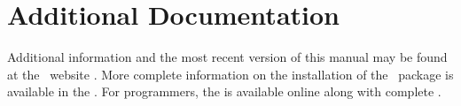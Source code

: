 \section{Additional Documentation} \label{additional-docs}
Additional information and the most recent version of this manual may
be found at the \PSIthree\ website .  
More complete information on the installation of the \PSIthree\ package
is available in the .
For programmers, the  is available online
along with complete .

